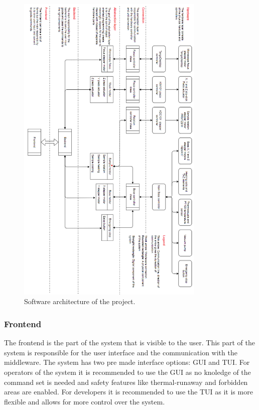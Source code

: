 \documentclass[11pt]{article}
\begin{document}
\begin{figure}[htp]
  \centering
  \includegraphics[width=0.8\textwidth]{img/code_flow.png}
  \caption{Software architecture of the project.}
  \label{fig:software_architecture}
\end{figure}

\subsubsection{Frontend}
The frontend is the part of the system that is visible to the user.
This part of the system is responsible for the user interface and the communication with the middleware.
The system has two pre made interface options: GUI and TUI.
For operators of the system it is recommended to use the GUI as no knoledge of the command set is needed and safety features like thermal-runaway and forbidden areas are enabled.
For developers it is recommended to use the TUI as it is more flexible and allows for more control over the system.
\end{document}
